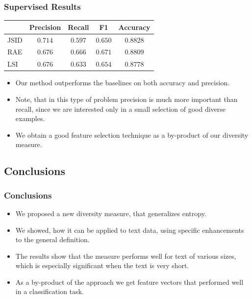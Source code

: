 \documentclass{beamer}
\begin{document}
\begin{frame}
\frametitle{Supervised Results}
\begin{table}[t]
\label{tab:classification-results}
\vspace{-4mm}
\begin{center}
\begin{tabular}{|l|c|c|c|c|}
\hline
&Precision & Recall & F1 & Accuracy
\\ \hline 
JSID         &$\mathbf{0.714}$&$0.597$&$0.650$& $\mathbf{0.8828}$\\
RAE             &$0.676$&$\mathbf{0.666}$&$\mathbf{0.671}$&$0.8809$ \\
LSI             &$0.676$&$0.633$&$0.654$&$0.8778$\\
\hline
\end{tabular}
\end{center}
\end{table}
\begin{itemize}
\item Our method outperforms the baselines on both accuracy and
  precision.
\item Note, that in this type of problem precision is much more
  important than recall, since we are interested only in a small
  selection of good diverse examples.
\item We obtain a good feature selection technique as a by-product
  of our diversity measure.
\end{itemize}
\end{frame}

\subsection{Conclusions}

\begin{frame}
\frametitle{Conclusions}
\begin{itemize}
\item We proposed a new diversity measure, that generalizes entropy.
\item We showed, how it can be applied to text data, using specific
  enhancements to the general definition.
\item The results show that the measure performs well for text of
  various sizes, which is especially significant when the text is very
  short.
\item As a by-product of the approach we get feature vectors that
  performed well in a classification task.
\end{itemize}
\end{frame}

\begin{frame}


\end{frame}
\end{document}
